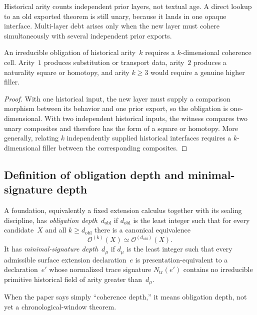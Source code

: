 \documentclass{lmcs}
\newcommand{\Ocal}{\mathcal{O}}
\begin{document}
\begin{rem}
\label{rem:deep-lookups}
Historical arity counts independent prior layers, not textual age. A direct lookup to an old exported theorem is still unary, because it lands in one opaque interface. Multi-layer debt arises only when the new layer must cohere simultaneously with several independent prior exports.
\end{rem}

\begin{lem}
\label{lem:arity-dimension}
An irreducible obligation of historical arity~$k$ requires a $k$-dimensional coherence cell. Arity~$1$ produces substitution or transport data, arity~$2$ produces a naturality square or homotopy, and arity $k \geq 3$ would require a genuine higher filler.
\end{lem}

\begin{proof}
With one historical input, the new layer must supply a comparison morphism between its behavior and one prior export, so the obligation is one-dimensional. With two independent historical inputs, the witness compares two unary composites and therefore has the form of a square or homotopy. More generally, relating $k$ independently supplied historical interfaces requires a $k$-dimensional filler between the corresponding composites.
\end{proof}

\subsection{Definition of obligation depth and minimal-signature depth}

\begin{defi}
\label{def:depth}
A foundation, equivalently a fixed extension calculus together with its sealing discipline, has \emph{obligation depth}~$d_{\mathrm{obl}}$ if $d_{\mathrm{obl}}$ is the least integer such that for every candidate~$X$ and all $k \geq d_{\mathrm{obl}}$ there is a canonical equivalence
\[
  \Ocal^{(k)}(X) \simeq \Ocal^{(d_{\mathrm{obl}})}(X).
\]
It has \emph{minimal-signature depth}~$d_\mu$ if $d_\mu$ is the least integer such that every admissible surface extension declaration~$e$ is presentation-equivalent to a declaration~$e'$ whose normalized trace signature $N_{\mathrm{tr}}(e')$ contains no irreducible primitive historical field of arity greater than~$d_\mu$.

When the paper says simply ``coherence depth,'' it means obligation depth, not yet a chronological-window theorem.
\end{defi}
\end{document}
